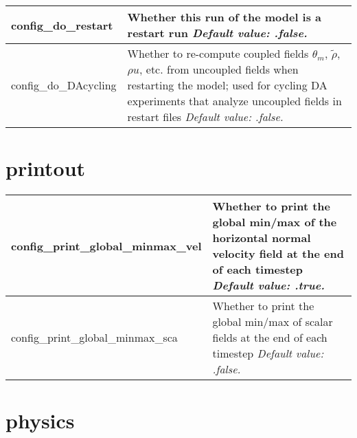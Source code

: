 {\small
\begin{longtable}{|p{2.0in} |p{4.25in}|}
 \hline
   config\_do\_restart & Whether this run of the model is a restart run \newline 
   {\em Default value: .false.} \\ \hline
 
   config\_do\_DAcycling & Whether to re-compute coupled fields $\theta_m$, $\tilde\rho$, $\rho u$,  etc. from uncoupled fields when restarting the model; used for cycling DA experiments that analyze uncoupled fields in restart files \newline 
   {\em Default value: .false.} \\ \hline   
\end{longtable}
}

\section{printout}

{\small
\begin{longtable}{|p{2.0in} |p{4.25in}|}
 \hline
   config\_print\_global\_minmax\_vel & Whether to print the global min/max of the horizontal normal velocity field at the end of each timestep \newline 
   {\em Default value: .true.} \\ \hline

   config\_print\_global\_minmax\_sca & Whether to print the global min/max of scalar fields at the end of each timestep \newline 
   {\em Default value: .false.} \\ \hline    
\end{longtable}
}
         
\section{physics}
\label{sec:physics_namelist}

